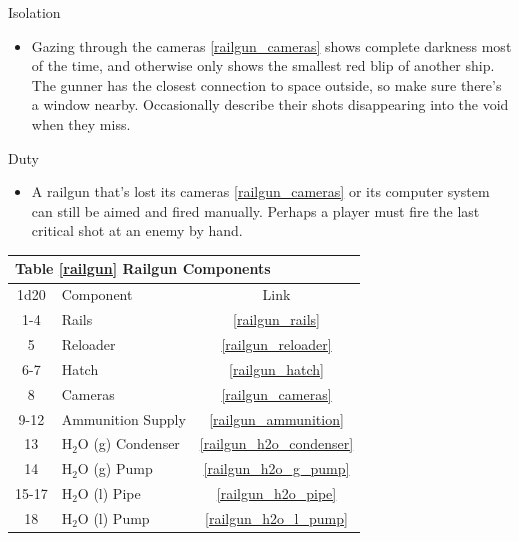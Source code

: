 \documentclass[a4paper]{article}
\begin{document}
\begin{minipage}[t]{0.4\linewidth}
Isolation
\begin{itemize}
\item Gazing through the cameras \ref{railgun_cameras} shows complete darkness most of the time, and otherwise only shows the smallest red blip of another ship. The gunner has the closest connection to space outside, so make sure there's a window nearby. Occasionally describe their shots disappearing into the void when they miss.
\end{itemize}
\end{minipage}
\begin{minipage}[t]{0.4\linewidth}
Duty
\begin{itemize}
\item A railgun that's lost its cameras \ref{railgun_cameras} or its computer system can still be aimed and fired manually. Perhaps a player must fire the last critical shot at an enemy by hand. 
\end{itemize}
\end{minipage}

\vspace{0.5cm} \hspace{0.25\linewidth}
\begin{tabular}{@{} | c | l | c | @{}}
\toprule
\multicolumn{3}{|l|}{Table \ref{railgun} Railgun Components} \\
\toprule
1d20 & Component & Link \\
\midrule
1-4 & Rails & \ref{railgun_rails} \\
5 & Reloader & \ref{railgun_reloader} \\
6-7 & Hatch & \ref{railgun_hatch} \\
8 & Cameras & \ref{railgun_cameras} \\
9-12 & Ammunition Supply & \ref{railgun_ammunition} \\
\midrule
13 & H$_2$O (g) Condenser & \ref{railgun_h2o_condenser} \\
14 & H$_2$O (g) Pump & \ref{railgun_h2o_g_pump} \\
15-17 & H$_2$O (l) Pipe & \ref{railgun_h2o_pipe} \\
18 & H$_2$O (l) Pump & \ref{railgun_h2o_l_pump} \\
\bottomrule
\end{tabular}
\end{document}
